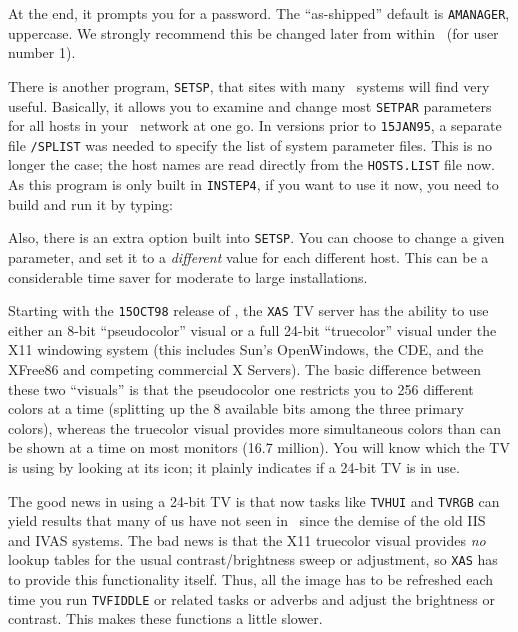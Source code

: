 At the end, it prompts you for a password.  The ``as-shipped'' default
is {\tt AMANAGER}, uppercase.  We strongly recommend this be changed
later from within \ttaips\ (for user number 1).

There is another program, {\tt SETSP}, that sites with many
\AIPS\ systems will find very useful.  Basically, it allows you to
examine and change most {\tt SETPAR} parameters for all hosts in your
\AIPS\ network at one go.  In versions prior to {\tt 15JAN95}, a
separate file {\tt {}/SPLIST} was needed to specify the list of
system parameter files.  This is no longer the case; the host names are
read directly from the {\tt HOSTS.LIST} file now.  As this program is
only built in {\tt INSTEP4}, if you want to use it now, you need to
build and run it by typing:\medskip

\medskip

\noindent Also, there is an extra option built into {\tt SETSP}.  You
can choose to change a given parameter, and set it to a {\it
different\/} value for each different host.  This can be a considerable
time saver for moderate to large installations.

\medskip{}

Starting with the {\tt 15OCT98} release of \AIPS, the {\tt XAS} TV
server has the ability to use either an 8-bit ``pseudocolor'' visual or
a full 24-bit ``truecolor'' visual under the X11 windowing system (this
includes Sun's OpenWindows, the CDE, and the XFree86 and competing
commercial X Servers).  The basic difference between these two
``visuals'' is that the pseudocolor one restricts you to 256 different
colors at a time (splitting up the 8 available bits among the three
primary colors), whereas the truecolor visual provides more simultaneous
colors than can be shown at a time on most monitors (16.7 million).
You will know which the TV is using by looking at its icon; it plainly
indicates if a 24-bit TV is in use.

The good news in using a 24-bit TV is that now tasks like {\tt TVHUI}
and {\tt TVRGB} can yield results that many of us have not seen in
\AIPS\ since the demise of the old IIS and IVAS systems.  The bad news
is that the X11 truecolor visual provides {\it no\/} lookup tables for
the usual contrast/brightness sweep or adjustment, so {\tt XAS} has to
provide this functionality itself.  Thus, all the image has to be
refreshed each time you run {\tt TVFIDDLE} or related tasks or adverbs
and adjust the brightness or contrast.  This makes these functions a
little slower.

